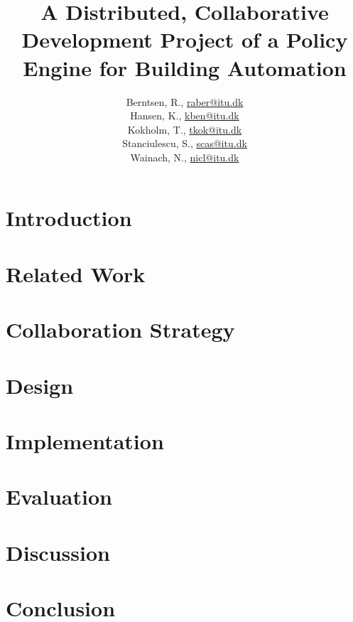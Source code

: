 \documentclass[11pt]{report}
\title{A Distributed, Collaborative Development Project of a Policy Engine for Building Automation\\\scalebox{0.85}{Global Software Development}}
\author{Berntsen, R., \url{raber@itu.dk}\\Hansen, K., \url{kben@itu.dk}\\Kokholm, T., \url{tkok@itu.dk}\\Stanciulescu, S., \url{scas@itu.dk}\\Wainach, N., \url{nicl@itu.dk}}
\begin{document}
\maketitle
{}
\begin{abstract}

\end{abstract}

\tableofcontents
\clearpage
{}

\chapter{Introduction}\label{chapter:introduction}


\chapter{Related Work}\label{chapter:relatedwork}


\chapter{Collaboration Strategy}\label{chapter:method}


\chapter{Design}\label{chapter:design}


\chapter{Implementation}\label{chapter:implementation}



\chapter{Evaluation}\label{chapter:evaluation}


\chapter{Discussion}\label{chapter:discussion}



\chapter{Conclusion}\label{chapter:conclusion}
\end{document}
